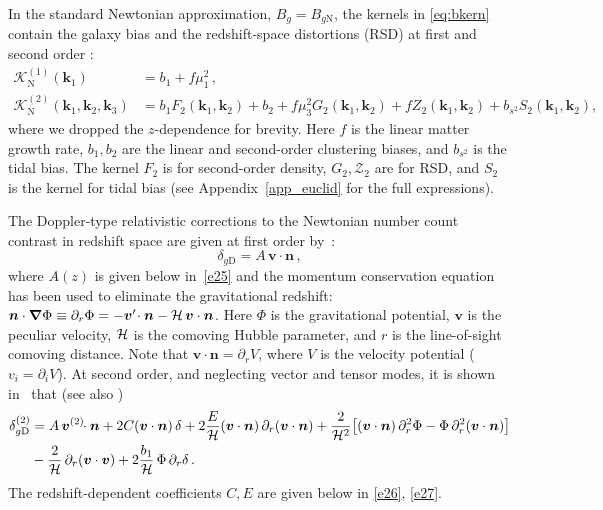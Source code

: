 In the standard Newtonian approximation, $B_g=B_{g{\mathrm{N}}}$, the kernels in \eqref{eq:bkern} contain the galaxy bias and the redshift-space distortions (RSD) at first and second order \cite{Bernardeau:2001qr, Karagiannis:2018jdt}:
\begin{align}
\mathcal{K}^{(1)}_{\mathrm{N}}(\bm{k}_{1}) &= b_{1}+f\mu_{1}^{2}\,,  \label{e15} \\ 
{\mathcal{K}^{(2)}_{\mathrm{N}}}(\bm{k}_{1}, \bm{k}_{2},{\bm{k}_3}) &= b_{1}F_{2}(\bm{k}_{1}, \bm{k}_{2}) + b_{2} + f\mu_{3}^{2}G_{2}(\bm{k}_{1}, \bm{k}_{2}) +{fZ_2}(\bm{k}_{1}, \bm{k}_{2})
+ b_{s^{2}}S_{2}(\bm{k}_{1}, \bm{k}_{2}) , \label{k2n}
\end{align}
where we dropped the $z$-dependence for brevity. Here $f$ is the linear matter growth rate, $b_1,b_2$ are the linear and second-order clustering biases, and $b_{s^{2}}$ is the tidal bias. The kernel  $F_2$ is for second-order density, $G_2 , \mathcal{Z}_2$ are for RSD,  and $S_2$  is the kernel for tidal bias (see Appendix~\ref{app_euclid} for the full expressions).


The Doppler-type relativistic corrections to the Newtonian number count contrast in redshift space are  given {at first order by~\cite{Bonvin:2011bg}:}
\begin{equation}
\delta_{g\mathrm{D}} =  {A}\,\bm{v}\cdot\bm{n}\,,\label{dg1}
\end{equation}
{where $A(z)$ is given below in~\eqref{e25} and the momentum conservation equation has been used to  eliminate the gravitational redshift: $\bm{n}\cdot\bm{\nabla}\Phi\equiv \partial_r \Phi = -\bm{v}'\!\cdot\bm{n}-\mathcal{H}\,\bm{v}\cdot\bm{n} $.} Here $\Phi$ is the gravitational potential, $\bm{v}$ is the peculiar velocity,  $\mathcal{H}$ is the comoving Hubble parameter, and $r$ is the line-of-sight comoving distance.
Note that $\bm{v}\cdot\bm{n}=\partial_r V$, where $V$ is the velocity potential ($v_i=\partial_iV$). 
At second order, and neglecting vector and tensor modes, it is shown in~\cite{Clarkson:2018dwn}  that (see also \cite{DiDio:2018zmk}) 
\begin{align}
\delta^{(2)}_{g{\mathrm{D}}}&= A\, \bm{v}^{(2)}\!\!\cdot\bm{n}+2{C}(\bm{v}\cdot\bm{n})\,\delta +2 \frac{{E}}{\mathcal{H}}(\bm{v}\cdot\bm{n})\,\partial_r(\bm{v}\cdot\bm{n})
+ \frac{2}{\mathcal{H}^2}\big[(\bm{v}\cdot\bm{n}) \,\partial_r^2\Phi-\Phi\, \partial_r^2 (\bm{v}\cdot\bm{n}) \big]
\nonumber\\ \label{eq:dgsecond}
& - \frac{2}{\mathcal{H}}\,\partial_r (\bm{v}\cdot\bm{v}) + 2 \frac{b_1}{\mathcal{H}}\,\Phi\, \partial_r\delta \,. 
\end{align}
The redshift-dependent coefficients $C,E$ are  given below  in \eqref{e26}, \eqref{e27}.



